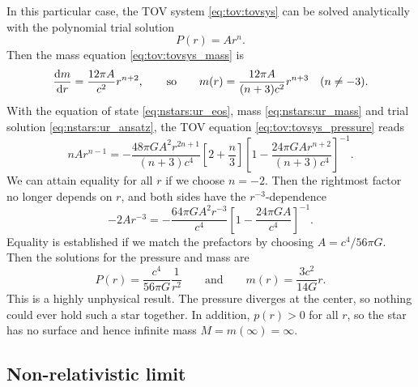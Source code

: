 In this particular case, the TOV system \eqref{eq:tov:tovsys} can be solved analytically with the polynomial trial solution
\begin{equation}
	P(r) = A r^n .
\label{eq:nstars:ur_ansatz}
\end{equation}
Then the mass equation \eqref{eq:tov:tovsys_mass} is
\begin{equation}
	\odv{m}{r} = \frac{12 \pi A}{c^2} r^{n+2},
	\qquad \text{so} \qquad
	m(r) = \frac{12 \pi A}{(n+3) c^2} r^{n+3}
	\quad (n \neq -3).
\label{eq:nstars:ur_mass}
\end{equation}
With the equation of state \eqref{eq:nstars:ur_eos}, mass \eqref{eq:nstars:ur_mass} and trial solution \eqref{eq:nstars:ur_ansatz}, the TOV equation \eqref{eq:tov:tovsys_pressure} reads
\begin{equation}
	n A r^{n-1} =
	-\frac{48 \pi G A^2 r^{2n+1}}{(n+3) c^4} \left[ 2 + \frac{n}{3} \right] \left[ 1 - \frac{24 \pi G A r^{n+2}}{(n+3) c^4} \right]^{-1} .
\end{equation}
We can attain equality for all $r$ if we choose $n = -2$.
Then the rightmost factor no longer depends on $r$, and both sides have the $r^{-3}$-dependence
\begin{equation}
	- 2 A r^{-3} = - \frac{64 \pi G A^2 r^{-3}}{c^4} \left[ 1 - \frac{24 \pi G A}{c^4} \right]^{-1} .
\end{equation}
Equality is established if we match the prefactors by choosing $A = c^4 / 56 \pi G$.
Then the solutions for the pressure and mass are
\begin{equation}
	P(r) = \frac{c^4}{56 \pi G} \frac{1}{r^2}
	\qquad \text{and} \qquad
	m(r) = \frac{3 c^2}{14 G} r .
\end{equation}
This is a highly unphysical result.
The pressure diverges at the center, so nothing could ever hold such a star together.
In addition, $p(r) > 0$ for all $r$, so the star has no surface and hence infinite mass $M = m(\infty) = \infty$.


\subsection{Non-relativistic limit}
\label{sec:nstars:nr_limit}

